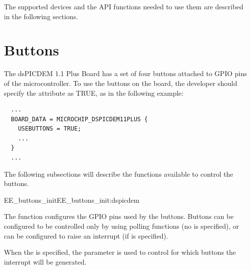The supported devices and the API functions needed to use them are
described in the following sections.


\section{Buttons}

The dsPICDEM 1.1 Plus Board has a set of four buttons attached to GPIO
pins of the microcontroller. To use the buttons on the board, the
developer should specify the  attribute as TRUE, as
in the following example:

\begin{lstlisting}
  ...
  BOARD_DATA = MICROCHIP_DSPICDEM11PLUS {
    USEBUTTONS = TRUE;
    ...
  }
  ...
\end{lstlisting}

The following subsections will describe the functions available to
control the buttons.

\begin{function_nopb2}{EE\_buttons\_init}{EE_buttons_init:dspicdem}
  
  \begin{fundescription}
    The function configures the GPIO pins used by the buttons. Buttons
    can be configured to be controlled only by using polling functions
    (no  is specified), or can be configured to raise
    an interrupt (if  is specified).

    When the  is specified, the  parameter
    is used to control for which buttons the interrupt will be
    generated.
  \end{fundescription}
  
  \begin{funparameters}

  \end{funparameters}
  
  \begin{funreturn}
  \end{funreturn}
  
\end{function_nopb2}


